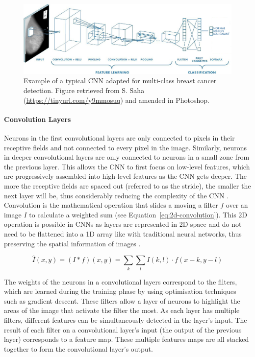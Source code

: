\begin{figure}[ht]
\centerline{\includegraphics[width=\textwidth]{figures/litsurvey/CNN example.png}}
\caption{\label{fig:litsurvey-CNN-example}Example of a typical CNN adapted for multi-class breast cancer detection. Figure retrieved from S. Saha (\url{https://tinyurl.com/y9mmosuq}) and amended in Photoshop.}
\end{figure}

\paragraph{Convolution Layers}

Neurons in the first convolutional layers are only connected to pixels in their receptive fields and not connected to every pixel in the image. Similarly, neurons in deeper convolutional layers are only connected to neurons in a small zone from the previous layer. This allows the CNN to first focus on low-level features, which are progressively assembled into high-level features as the CNN gets deeper. The more the receptive fields are spaced out (referred to as the stride), the smaller the next layer will be, thus considerably reducing the complexity of the CNN \citep{Geron2019}. Convolution is the mathematical operation that slides a moving a filter $f$ over an image $I$ to calculate a weighted sum (see Equation~\ref{eq:2d-convolution}). This 2D operation is possible in CNNs as layers are represented in 2D space and do not need to be flattened into a 1D array like with traditional neural networks, thus preserving the spatial information of images \citep{szeliski2010computer}.

\begin{equation}
\label{eq:2d-convolution}
    \hat{I}(x,y)=(I*f)(x,y)=\sum_{k}\sum_{l}I(k,l)\cdot f(x-k, y-l)
\end{equation}

The weights of the neurons in a convolutional layers correspond to the filters, which are learned during the training phase by using optimisation techniques such as gradient descent. These filters allow a layer of neurons to highlight the areas of the image that activate the filter the most. As each layer has multiple filters, different features can be simultaneously detected in the layer's input. The result of each filter on a convolutional layer's input (the output of the previous layer) corresponds to a feature map. These multiple features maps are all stacked together to form the convolutional layer's output.

